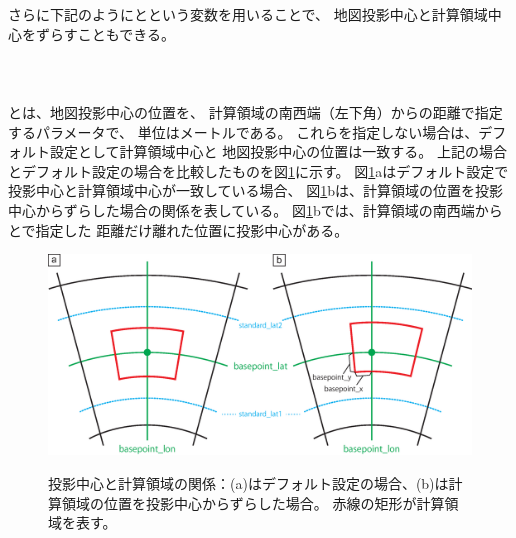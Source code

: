 さらに下記のようにとという変数を用いることで、
地図投影中心と計算領域中心をずらすこともできる。\\~\\
{\small {\gt
{}}}\\~\\
とは、地図投影中心の位置を、
計算領域の南西端（左下角）からの距離で指定するパラメータで、
単位はメートルである。
これらを指定しない場合は、デフォルト設定として計算領域中心と
地図投影中心の位置は一致する。
上記の場合とデフォルト設定の場合を比較したものを図\ref{fig:map_lc}に示す。
図\ref{fig:map_lc}aはデフォルト設定で投影中心と計算領域中心が一致している場合、
図\ref{fig:map_lc}bは、計算領域の位置を投影中心からずらした場合の関係を表している。
図\ref{fig:map_lc}bでは、計算領域の南西端から
とで指定した
距離だけ離れた位置に投影中心がある。

\begin{figure}[t]
\begin{center}
  \includegraphics[width=0.8\hsize]{./figure/LC_latlon_xy.eps}\\
  \caption{投影中心と計算領域の関係：(a)はデフォルト設定の場合、(b)は計算領域の位置を投影中心からずらした場合。
  赤線の矩形が計算領域を表す。}
  \label{fig:map_lc}
\end{center}
\end{figure}

